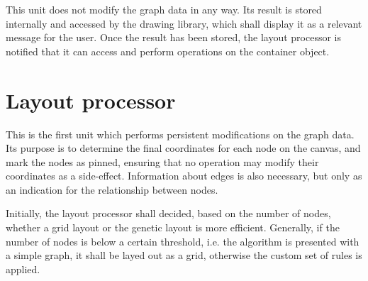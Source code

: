 This unit does not modify the graph data in any way. Its result is stored internally and accessed by the 
drawing library, which shall display it as a relevant message for the user. Once the result has been stored, 
the layout processor is notified that it can access and perform operations on the container object.

\section{Layout processor}

This is the first unit which performs persistent modifications on the graph data. Its purpose is to determine 
the final coordinates for each node on the canvas, and mark the nodes as pinned, ensuring that no operation may 
modify their coordinates as a side-effect. Information about edges is also necessary, but only as an indication 
for the relationship between nodes.

Initially, the layout processor shall decided, based on the number of nodes, whether a grid layout or the genetic 
layout is more efficient. Generally, if the number of nodes is below a certain threshold, i.e. the algorithm is 
presented with a simple graph, it shall be layed out as a grid, otherwise the custom set of rules is applied.
